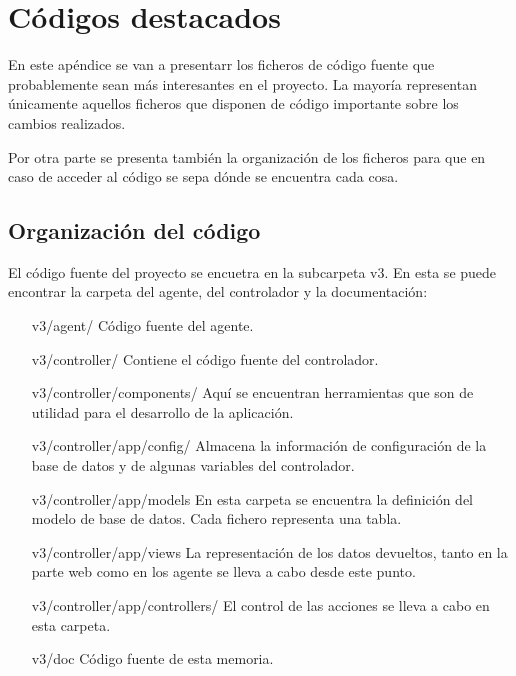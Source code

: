 \chapter{Códigos destacados} 

En este apéndice se van a presentarr los ficheros de código fuente que probablemente sean más interesantes en el proyecto. La mayoría representan únicamente aquellos ficheros que disponen de código importante sobre los cambios realizados.

Por otra parte se presenta también la organización de los ficheros para que en caso de acceder al código se sepa dónde se encuentra cada cosa.

\section{Organización del código}

El código fuente del proyecto se encuetra en la subcarpeta v3. En esta se puede encontrar la carpeta del agente, del controlador y la documentación:

\begin{enumerate}
	\item[v3/agent/] Código fuente del agente.

	\item[v3/controller/] Contiene el código fuente del controlador.
	
	\item[v3/controller/components/] Aquí se encuentran herramientas que son de utilidad para el desarrollo de la aplicación.

	\item[v3/controller/app/config/] Almacena la información de configuración de la base de datos y de algunas variables del controlador.

	\item[v3/controller/app/models] En esta carpeta se encuentra la definición del modelo de base de datos. Cada fichero representa una tabla.

	\item[v3/controller/app/views] La representación de los datos devueltos, tanto en la parte web como en los agente se lleva a cabo desde este punto.

	\item[v3/controller/app/controllers/] El control de las acciones se lleva a cabo en esta carpeta.

	\item[v3/doc] Código fuente de esta memoria.
\end{enumerate}

